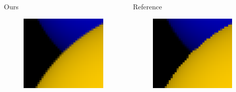 \documentclass{beamer}
\begin{document}
\begin{frame}
	\begin{columns}[T]
		\begin{column}{.5\textwidth}
			Ours
			\begin{figure}
				\includegraphics[width=\textwidth]{raytracer/zoomed-scene01-ss.png}
			\end{figure}
		\end{column}
		\begin{column}{.5\textwidth}
			Reference
			\begin{figure}
				\includegraphics[width=\textwidth]{raytracer/zoomed-scene01-ss-ref.png}
			\end{figure}
		\end{column}
	\end{columns}
\end{frame}
\end{document}
